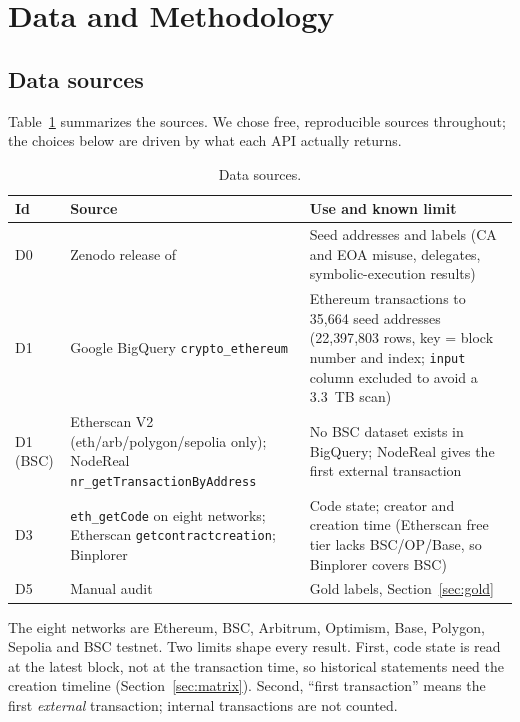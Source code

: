 \documentclass[runningheads]{llncs}
\begin{document}
\section{Data and Methodology}
\label{sec:method}
\subsection{Data sources}
Table~\ref{tab:data} summarizes the sources. We chose free, reproducible
sources throughout; the choices below are driven by what each API actually
returns.
\begin{table}[t]
\caption{Data sources.}
\label{tab:data}
\centering
\small
\begin{tabular}{@{}>{\raggedright\arraybackslash}p{1.6cm}>{\raggedright\arraybackslash}p{4.1cm}>{\raggedright\arraybackslash}p{5.5cm}@{}}
\toprule
Id & Source & Use and known limit\\
\midrule
D0 & Zenodo release of~\cite{shao2026lost} & Seed addresses and labels (CA and EOA misuse, delegates, symbolic-execution results)\\
D1 & Google BigQuery \texttt{crypto\_ethereum} & Ethereum transactions to 35{,}664 seed addresses (22{,}397{,}803 rows, key = block number and index; \texttt{input} column excluded to avoid a 3.3~TB scan)\\
D1 (BSC) & Etherscan V2 (eth/arb/polygon/sepolia only); NodeReal \texttt{nr\_getTransaction}\-\texttt{ByAddress} & No BSC dataset exists in BigQuery; NodeReal gives the first external transaction\\
D3 & \texttt{eth\_getCode} on eight networks; Etherscan \texttt{getcontractcreation}; Binplorer & Code state; creator and creation time (Etherscan free tier lacks BSC/OP/Base, so Binplorer covers BSC)\\
D5 & Manual audit & Gold labels, Section~\ref{sec:gold}\\
\bottomrule
\end{tabular}
\end{table}
The eight networks are Ethereum, BSC, Arbitrum, Optimism, Base, Polygon, Sepolia
and BSC testnet. Two limits shape every result. First, code state is read at
the latest block, not at the transaction time, so historical statements need the
creation timeline (Section~\ref{sec:matrix}). Second, ``first transaction''
means the first \emph{external} transaction; internal transactions are not
counted.
\end{document}
